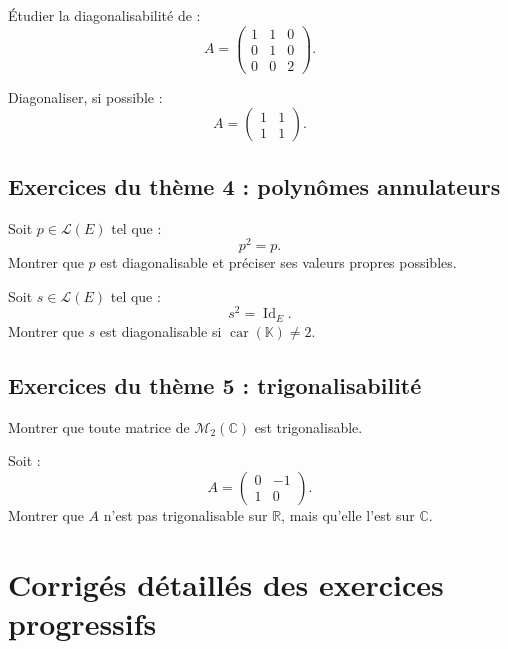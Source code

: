 \documentclass[11pt,a4paper]{article}
\newcommand{\K}{\mathbb K}
\newcommand{\R}{\mathbb R}
\newcommand{\C}{\mathbb C}
\newcommand{\M}{\mathcal M}
\newcommand{\Lcal}{\mathcal L}
\newcommand{\Id}{\operatorname{Id}}
\begin{document}
\begin{exercicebox}[5]
Étudier la diagonalisabilité de :
\[
A=
\begin{pmatrix}
1&1&0\\
0&1&0\\
0&0&2
\end{pmatrix}.
\]
\end{exercicebox}

\begin{exercicebox}[6]
Diagonaliser, si possible :
\[
A=
\begin{pmatrix}
1&1\\
1&1
\end{pmatrix}.
\]
\end{exercicebox}

\subsection*{Exercices du thème 4 : polynômes annulateurs}

\begin{exercicebox}[7]
Soit \(p\in\Lcal(E)\) tel que :
\[
p^2=p.
\]
Montrer que \(p\) est diagonalisable et préciser ses valeurs propres possibles.
\end{exercicebox}

\begin{exercicebox}[8]
Soit \(s\in\Lcal(E)\) tel que :
\[
s^2=\Id_E.
\]
Montrer que \(s\) est diagonalisable si \(\operatorname{car}(\K)\neq2\).
\end{exercicebox}

\subsection*{Exercices du thème 5 : trigonalisabilité}

\begin{exercicebox}[9]
Montrer que toute matrice de \(\M_2(\C)\) est trigonalisable.
\end{exercicebox}

\begin{exercicebox}[10]
Soit :
\[
A=
\begin{pmatrix}
0&-1\\
1&0
\end{pmatrix}.
\]
Montrer que \(A\) n'est pas trigonalisable sur \(\R\), mais qu'elle l'est sur \(\C\).
\end{exercicebox}

\newpage
\section{Corrigés détaillés des exercices progressifs}
\end{document}
